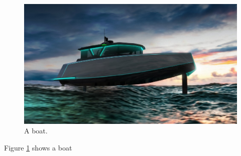 \documentclass{article}
\begin{document}
	\begin{figure}
		\includegraphics[width=\linewidth]{boat.jpg}
		\caption{A boat.}
		\label{fig:boat1}
	\end{figure}
Figure \ref{fig:boat1} shows a boat 
\end{document}
